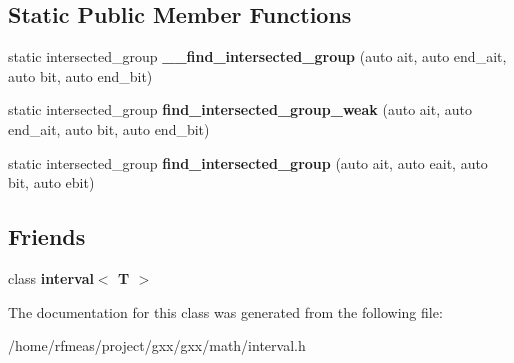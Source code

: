 \subsection*{Static Public Member Functions}
\begin{DoxyCompactItemize}
\item 
static intersected\+\_\+group {\bfseries \+\_\+\+\_\+find\+\_\+intersected\+\_\+group} (auto ait, auto end\+\_\+ait, auto bit, auto end\+\_\+bit)\hypertarget{structgxx_1_1math_1_1interval__union_a0416b87a43a5c1bd4beae1ac6e4a2fd0}{}\label{structgxx_1_1math_1_1interval__union_a0416b87a43a5c1bd4beae1ac6e4a2fd0}

\item 
static intersected\+\_\+group {\bfseries find\+\_\+intersected\+\_\+group\+\_\+weak} (auto ait, auto end\+\_\+ait, auto bit, auto end\+\_\+bit)\hypertarget{structgxx_1_1math_1_1interval__union_a827593e9faf6a377f45e0412f2ea4187}{}\label{structgxx_1_1math_1_1interval__union_a827593e9faf6a377f45e0412f2ea4187}

\item 
static intersected\+\_\+group {\bfseries find\+\_\+intersected\+\_\+group} (auto ait, auto eait, auto bit, auto ebit)\hypertarget{structgxx_1_1math_1_1interval__union_a900e900a5daa207bf369ee5f39b96e11}{}\label{structgxx_1_1math_1_1interval__union_a900e900a5daa207bf369ee5f39b96e11}

\end{DoxyCompactItemize}
\subsection*{Friends}
\begin{DoxyCompactItemize}
\item 
class {\bfseries interval$<$ T $>$}\hypertarget{structgxx_1_1math_1_1interval__union_a61a029866976221a25c7445ef1225929}{}\label{structgxx_1_1math_1_1interval__union_a61a029866976221a25c7445ef1225929}

\end{DoxyCompactItemize}


The documentation for this class was generated from the following file\+:\begin{DoxyCompactItemize}
\item 
/home/rfmeas/project/gxx/gxx/math/interval.\+h\end{DoxyCompactItemize}
